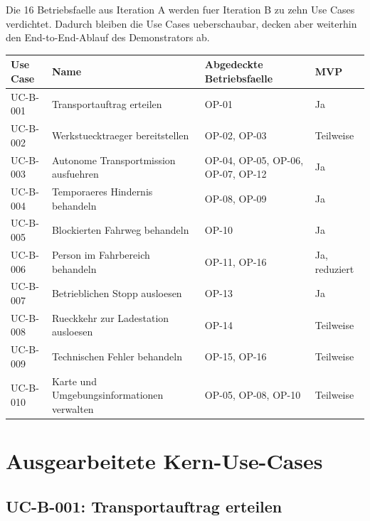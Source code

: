 Die 16 Betriebsfaelle aus Iteration A werden fuer Iteration B zu zehn Use Cases verdichtet. Dadurch bleiben die Use Cases ueberschaubar, decken aber weiterhin den End-to-End-Ablauf des Demonstrators ab.

\begin{longtable}{L{0.16\textwidth} L{0.28\textwidth} L{0.30\textwidth} L{0.14\textwidth}}
\toprule
Use Case & Name & Abgedeckte Betriebsfaelle & MVP \\
\midrule
UC-B-001 & Transportauftrag erteilen & OP-01 & Ja \\
UC-B-002 & Werkstuecktraeger bereitstellen & OP-02, OP-03 & Teilweise \\
UC-B-003 & Autonome Transportmission ausfuehren & OP-04, OP-05, OP-06, OP-07, OP-12 & Ja \\
UC-B-004 & Temporaeres Hindernis behandeln & OP-08, OP-09 & Ja \\
UC-B-005 & Blockierten Fahrweg behandeln & OP-10 & Ja \\
UC-B-006 & Person im Fahrbereich behandeln & OP-11, OP-16 & Ja, reduziert \\
UC-B-007 & Betrieblichen Stopp ausloesen & OP-13 & Ja \\
UC-B-008 & Rueckkehr zur Ladestation ausloesen & OP-14 & Teilweise \\
UC-B-009 & Technischen Fehler behandeln & OP-15, OP-16 & Teilweise \\
UC-B-010 & Karte und Umgebungsinformationen verwalten & OP-05, OP-08, OP-10 & Teilweise \\
\bottomrule
\end{longtable}

\section{Ausgearbeitete Kern-Use-Cases}

\subsection{UC-B-001: Transportauftrag erteilen}

